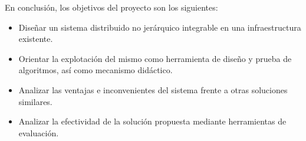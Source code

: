 \vspace{2cm}

En conclusión, los objetivos del proyecto son los siguientes:

\begin{center}
\itshape
\begin{itemize}
	\item[] Diseñar un sistema distribuido no jerárquico integrable en una infraestructura existente.
	\item[] Orientar la explotación del mismo como herramienta de diseño y prueba de algoritmos, así como mecanismo didáctico.
	\item[] Analizar las ventajas e inconvenientes del sistema frente a otras soluciones similares.
	\item[] Analizar la efectividad de la solución propuesta mediante herramientas de evaluación.
\end{itemize}
\end{center}